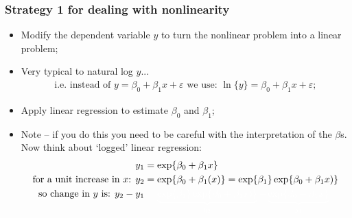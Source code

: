 \documentclass[aspectratio=169]{beamer}
\theoremstyle{principle}
\begin{document}
\begin{frame}
\frametitle{Strategy 1 for dealing with nonlinearity}

\begin{itemize}
\item Modify the dependent variable $y$ to turn the nonlinear problem into a linear problem;
\item Very typical to natural log $y$...
\begin{align*}
\mbox{i.e. instead of }y = \beta_0 + \beta_1x + \varepsilon\mbox{ we use: }\ln\{y\} = \beta_0 + \beta_1x + \varepsilon;
\end{align*}
\item Apply linear regression to estimate $\beta_0$ and $\beta_1$;
\item Note -- if you do this you need to be careful with the interpretation of the $\beta$s.  Now think about `logged' linear regression:
\begin{align*}
y_1 &= \exp\{\beta_0 + \beta_1x\}\\
\mbox{for a unit increase in $x$: } y_2 &= \exp\{\beta_0 + \beta_1(x)\} = \exp\{\beta_1\}\exp\{\beta_0 + \beta_1x)\}\\
\mbox{so change in $y$ is: }y_2 - y_1 &\color{white}= \underbrace{\exp\{\beta_1\}\exp\{\beta_0 + \beta_1x)\}}_{y_2} - \underbrace{\exp\{\beta_0 + \beta_1x\}}_{y_1}
\end{align*}

\end{itemize}

\end{frame}
\end{document}
